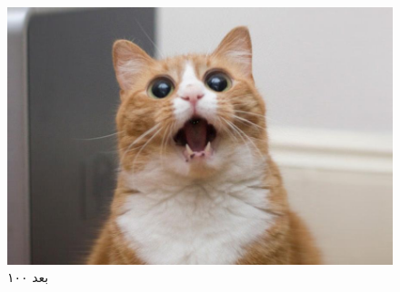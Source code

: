 \begin{sol}
\begin{figure}[h]
\centering
\includegraphics[scale=0.2]{part4.jpg}
\caption{بعد ۱۰۰}
\label{fig: 4-aprt4}
\end{figure}



\end{sol}
